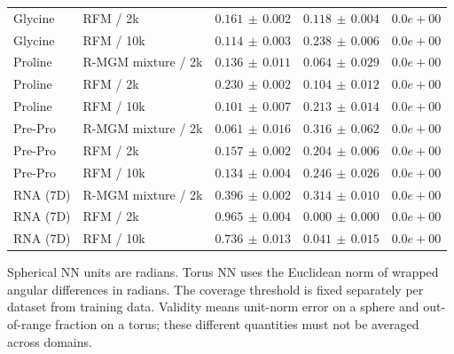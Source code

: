 \begin{table}[t]
\begin{tabular}{@{}llrrr@{}}
Glycine & RFM / 2k & $0.161\,\pm\,0.002$ & $0.118\,\pm\,0.004$ & $0.0e+00$ \\
Glycine & RFM / 10k & $0.114\,\pm\,0.003$ & $0.238\,\pm\,0.006$ & $0.0e+00$ \\
Proline & R-MGM mixture / 2k & $0.136\,\pm\,0.011$ & $0.064\,\pm\,0.029$ & $0.0e+00$ \\
Proline & RFM / 2k & $0.230\,\pm\,0.002$ & $0.104\,\pm\,0.012$ & $0.0e+00$ \\
Proline & RFM / 10k & $0.101\,\pm\,0.007$ & $0.213\,\pm\,0.014$ & $0.0e+00$ \\
Pre-Pro & R-MGM mixture / 2k & $0.061\,\pm\,0.016$ & $0.316\,\pm\,0.062$ & $0.0e+00$ \\
Pre-Pro & RFM / 2k & $0.157\,\pm\,0.002$ & $0.204\,\pm\,0.006$ & $0.0e+00$ \\
Pre-Pro & RFM / 10k & $0.134\,\pm\,0.004$ & $0.246\,\pm\,0.026$ & $0.0e+00$ \\
RNA (7D) & R-MGM mixture / 2k & $0.396\,\pm\,0.002$ & $0.314\,\pm\,0.010$ & $0.0e+00$ \\
RNA (7D) & RFM / 2k & $0.965\,\pm\,0.004$ & $0.000\,\pm\,0.000$ & $0.0e+00$ \\
RNA (7D) & RFM / 10k & $0.736\,\pm\,0.013$ & $0.041\,\pm\,0.015$ & $0.0e+00$ \\
\bottomrule\end{tabular}\end{table}
Spherical NN units are radians. Torus NN uses the Euclidean norm of wrapped angular differences in radians. The coverage threshold is fixed separately per dataset from training data. Validity means unit-norm error on a sphere and out-of-range fraction on a torus; these different quantities must not be averaged across domains.
